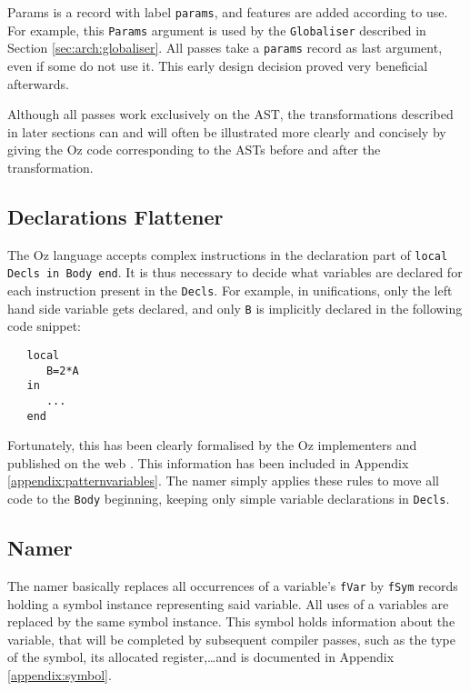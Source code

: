 \documentclass[a4paper]{memoir}
\begin{document}
Params is a record with label \lstinline!params!, and features are added
according to use. For example, this \lstinline!Params! argument is used by
the \lstinline!Globaliser! described in Section \ref{sec:arch:globaliser}. All
passes take a \lstinline!params! record as last argument, even if some do not use it. 
This early design decision proved very beneficial afterwards.


Although all passes work exclusively on the AST, the transformations described in later sections can and will often be illustrated more clearly and concisely by giving the Oz code corresponding to the ASTs before and after the transformation. 

\subsection{Declarations Flattener}\label{sec:arch:declsflattener}
The Oz language accepts complex instructions in the declaration part of
\lstinline!local Decls in Body end!. It is thus necessary to decide what variables are declared for each instruction present in the \lstinline!Decls!. 
For example, in unifications, only the left hand side variable gets declared,
and only \lstinline!B! is implicitly declared in the following code snippet:
\begin{lstlisting}
   local
      B=2*A
   in
      ...
   end
\end{lstlisting}
Fortunately, this has been clearly formalised by the Oz implementers and published on the web \cite{BaseLang}. This information has been included in Appendix \ref{appendix:patternvariables}. The namer simply applies these rules to move all code to the \lstinline!Body! beginning, keeping only simple variable declarations in \lstinline!Decls!.

\subsection{Namer}\label{sec:arch:namer}
The namer  basically replaces all occurrences of a variable's \lstinline!fVar! by \lstinline!fSym! records holding a symbol instance representing said variable. All uses of a variables are replaced by the same symbol instance. This symbol holds information about the variable, that will be completed by subsequent compiler passes, such as the type of the symbol, its allocated register,\ldots and is documented in Appendix \ref{appendix:symbol}.
\end{document}
